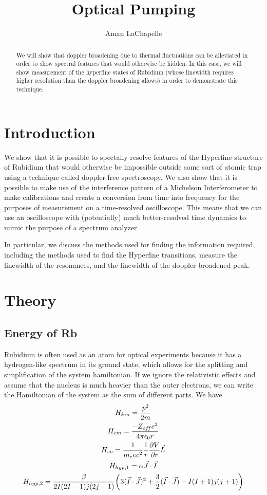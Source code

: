 \documentclass{article}
\title{Optical Pumping}
\author{Aman LaChapelle}
\DeclarePairedDelimiter{\parens}{\lparen}{\rparen}
\begin{document}
\raggedright
\maketitle

\begin{abstract}
  We will show that doppler broadening due to thermal fluctuations can be alleviated in order to show spectral features that would otherwise be hidden.  In this case, we will show measurement of the hyperfine states of Rubidium (whose linewidth requires higher resolution than the doppler broadening allows) in order to demonstrate this technique.
\end{abstract}

\tableofcontents
\newpage

\section{Introduction}
  We show that it is possible to spectally resolve features of the Hyperfine structure of Rubidium that would otherwise be impossible outside some sort of atomic trap using a technique called doppler-free spectroscopy.  We also show that it is possible to make use of the interference pattern of a Michelson Interferometer to make calibrations and create a conversion from time into frequency for the purposes of measurement on a time-resolved oscilloscope.  This means that we can use an oscilloscope with (potentially) much better-resolved time dynamics to mimic the purpose of a spectrum analyzer.

  \hspace{.25cm}

  In particular, we discuss the methods used for finding the information required, including the methods used to find the Hyperfine transitions, measure the linewidth of the resonances, and the linewidth of the doppler-broadened peak.

\section{Theory}
  \subsection{Energy of Rb}
  Rubidium is often used as an atom for optical experiments because it has a hydrogen-like spectrum in its ground state, which allows for the splitting and simplification of the system hamiltonian.  If we ignore the relativistic effects and assume that the nucleus is much heavier than the outer electrons, we can write the Hamiltonian of the system as the sum of different parts.  We have
  \begin{gather*}
    H_{kin} = \frac{p^2}{2m} \\
    H_{em} = \frac{-Z_{ef\!f}e^2}{4\pi\epsilon_0r} \\
    H_{so} = \frac{1}{m_e e c^2}\frac{1}{r}\pdv{V}{r}\vec{L} \\
    H_{hyp, 1} = \alpha \vec{J}\cdot\vec{I} \\
    H_{hyp, 2} = \frac{\beta}{2I(2I-1)j(2j-1)}\parens*{3(\vec{I}\cdot\vec{J})^2 + \frac{3}{2}(\vec{I}\cdot\vec{J}) - I(I+1)j(j+1)}
  \end{gather*}
\end{document}
